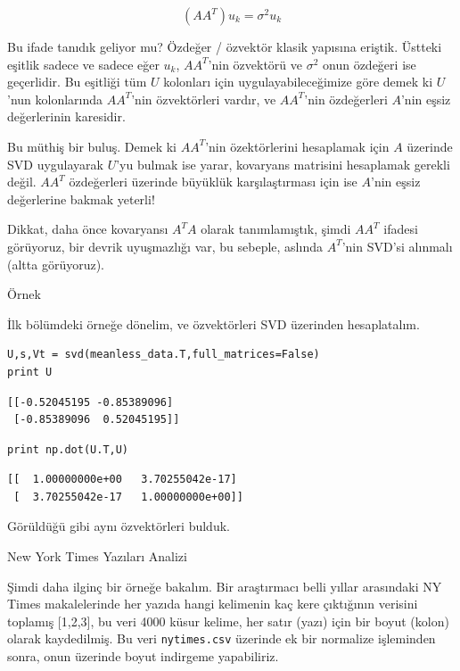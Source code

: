 \documentclass[12pt,fleqn]{article}\usepackage{../../common}
\begin{document}
$$ (AA^T)u_k = \sigma^2 u_k   $$

Bu ifade tanıdık geliyor mu? Özdeğer / özvektör klasik yapısına
eriştik. Üstteki  eşitlik sadece ve sadece eğer $u_k$, $AA^T$'nin
özvektörü ve $\sigma^2$ onun özdeğeri ise geçerlidir. Bu eşitliği tüm
$U$ kolonları için uygulayabileceğimize göre demek ki $U$'nun
kolonlarında $AA^T$'nin özvektörleri vardır, ve $AA^T$'nin özdeğerleri
$A$'nin eşsiz değerlerinin karesidir.

Bu müthiş bir buluş. Demek ki $AA^T$'nin özektörlerini hesaplamak için $A$
üzerinde SVD uygulayarak $U$'yu bulmak ise yarar, kovaryans matrisini
hesaplamak gerekli değil. $AA^T$ özdeğerleri üzerinde büyüklük
karşılaştırması için ise $A$'nin eşsiz değerlerine bakmak yeterli! 

Dikkat, daha önce kovaryansı $A^TA$ olarak tanımlamıştık, şimdi $AA^T$
ifadesi görüyoruz, bir devrik uyuşmazlığı var, bu sebeple, aslında
$A^T$'nin SVD'si alınmalı (altta görüyoruz).

Örnek

İlk bölümdeki örneğe dönelim, ve özvektörleri SVD üzerinden
hesaplatalım. 

\begin{verbatim}
U,s,Vt = svd(meanless_data.T,full_matrices=False)
print U
\end{verbatim}

\begin{verbatim}
[[-0.52045195 -0.85389096]
 [-0.85389096  0.52045195]]
\end{verbatim}

\begin{verbatim}
print np.dot(U.T,U)
\end{verbatim}

\begin{verbatim}
[[  1.00000000e+00   3.70255042e-17]
 [  3.70255042e-17   1.00000000e+00]]
\end{verbatim}

Görüldüğü gibi aynı özvektörleri bulduk.

New York Times Yazıları Analizi

Şimdi daha ilginç bir örneğe bakalım. Bir araştırmacı belli yıllar
arasındaki NY Times makalelerinde her yazıda hangi kelimenin kaç kere
çıktığının verisini toplamış [1,2,3], bu veri 4000 küsur kelime, her satır
(yazı) için bir boyut (kolon) olarak kaydedilmiş. Bu veri
\verb!nytimes.csv! üzerinde ek bir normalize işleminden sonra, onun
üzerinde boyut indirgeme yapabiliriz.
\end{document}
